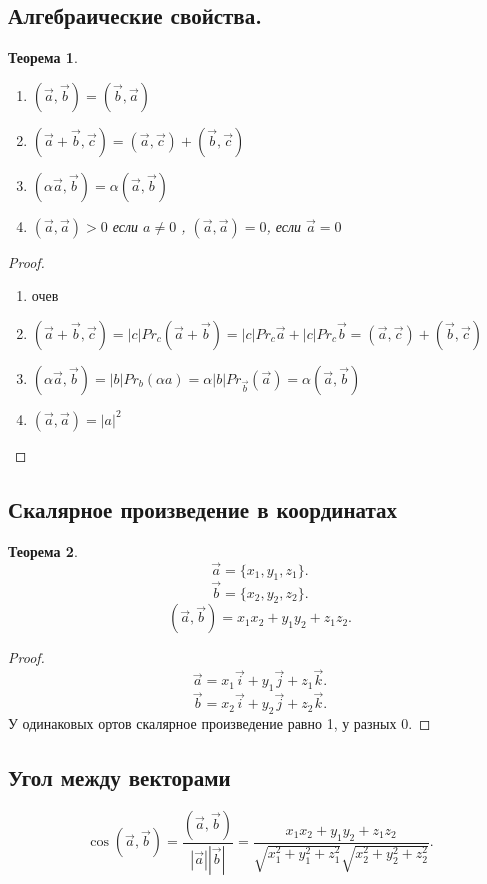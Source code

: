 \documentclass{scrartcl}
\newtheorem{theorem}{Теорема}
\begin{document}
    \subsection{Алгебраические свойства.}
    \begin{theorem}
        \begin{enumerate}
            \item $(\vec{a},\vec{b}) = (\vec{b},\vec{a})$
            \item $(\vec{a} + \vec{b},\vec{c}) =(\vec{a},\vec{c}) + (\vec{b}, \vec{c})$
            \item $(\alpha \vec{a},\vec{b}) = \alpha (\vec{a},\vec{b})$
            \item $(\vec{a},\vec{a}) > 0$ если $a \neq 0$ , $(\vec{a},\vec{a})=0$, если $\vec{a} = 0$
        \end{enumerate}
    \end{theorem}
    \begin{proof}
        \begin{enumerate}
            \item очев
            \item $(\vec{a} + \vec{b},\vec{c}) = |c| Pr_{c}(\vec{a} + \vec{b}) =
                |c|Pr_{c}\vec{a} + |c| Pr_{c}\vec{b} = (\vec{a},\vec{c}) + (\vec{b},\vec{c})$
            \item $(\alpha \vec{a},\vec{b}) = |b|Pr_{b}(\alpha a) = \alpha |b| Pr_{\vec{b}}(\vec{a}) = \alpha (\vec{a},\vec{b})$
            \item $(\vec{a},\vec{a}) = |a|^2$
        \end{enumerate}
    \end{proof}
    \subsection{Скалярное произведение в координатах}
    \begin{theorem}
        \[
            \vec{a} = \{x_1,y_1,z_1\}
        .\] 
        \[
            \vec{b} = \{x_2,y_2,z_2\}
        .\] 
        \[
            (\vec{a},\vec{b}) = x_1x_2 + y_1y_2 + z_1z_2
        .\] 
    \end{theorem}
    \begin{proof}
        \[
            \vec{a} = x_1 \vec{i} + y_1 \vec{j} + z_1 \vec{k}
        .\] 
        \[
        \vec{b} = x_2 \vec{i} + y_2 \vec{j} + z_2 \vec{k}
        .\] 
        У одинаковых ортов скалярное произведение равно 1, у разных 0.
    \end{proof}
    \subsection{Угол между векторами}
    \[
    \cos(\vec{a},\vec{b}) = \frac{(\vec{a},\vec{b})}{|\vec{a}||\vec{b}|} =
    \frac{x_1x_2 + y_1 y_2 + z_1 z_2}{\sqrt{x_1^2 + y_1^2 + z_1 ^2} \sqrt{x_2^2 + y_2^2 + z_2^2}}
    .\] 
\end{document}
